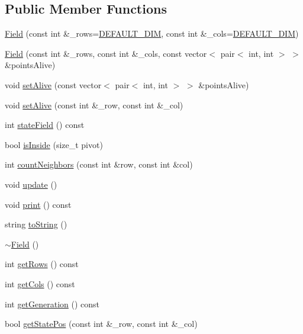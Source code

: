 \subsection*{Public Member Functions}
\begin{DoxyCompactItemize}
\item 
\hyperlink{classField_a9db14b333489e7cb486b1d06631aa3ea}{Field} (const int \&\+\_\+rows=\hyperlink{classField_add3cd7850a250739b0eb08caf41427da}{D\+E\+F\+A\+U\+L\+T\+\_\+\+D\+IM}, const int \&\+\_\+cols=\hyperlink{classField_add3cd7850a250739b0eb08caf41427da}{D\+E\+F\+A\+U\+L\+T\+\_\+\+D\+IM})
\item 
\hyperlink{classField_aa87243f12c97d3a861cbeeee9ad6d8c7}{Field} (const int \&\+\_\+rows, const int \&\+\_\+cols, const vector$<$ pair$<$ int, int $>$ $>$ \&points\+Alive)
\item 
void \hyperlink{classField_abb2ec476cd400e9c2e3fea4c502738de}{set\+Alive} (const vector$<$ pair$<$ int, int $>$ $>$ \&points\+Alive)
\item 
void \hyperlink{classField_ae7feca864aadf6aceba260cc6aee64b0}{set\+Alive} (const int \&\+\_\+row, const int \&\+\_\+col)
\item 
int \hyperlink{classField_ab4bf046987359d627f8583c3d4ae3c62}{state\+Field} () const 
\item 
bool \hyperlink{classField_a404555b889668199df5e5aa52270a3b1}{is\+Inside} (size\+\_\+t pivot)
\item 
int \hyperlink{classField_a8cf89a674edccb691fb3a61375fe7c68}{count\+Neighbors} (const int \&row, const int \&col)
\item 
void \hyperlink{classField_af48801e4d3d1b92ba7c094132fb56cb3}{update} ()
\item 
void \hyperlink{classField_ae1faecba43b9fb78e8662ec589ee00aa}{print} () const 
\item 
string \hyperlink{classField_aefecec2cf434f89b09d584cff80c8951}{to\+String} ()
\item 
\hyperlink{classField_a45d6e6d09b8f8e46de62b40119d62c60}{$\sim$\+Field} ()
\item 
int \hyperlink{classField_ae585f252de1b8fb4b90fd3424faa8e62}{get\+Rows} () const 
\item 
int \hyperlink{classField_a453287eda20027f08bf0f47033e13423}{get\+Cols} () const 
\item 
int \hyperlink{classField_aba0ae2354fad38ef65ba45dd63c0f788}{get\+Generation} () const 
\item 
bool \hyperlink{classField_ae96f8883d511c998bdb984ffee5dafa5}{get\+State\+Pos} (const int \&\+\_\+row, const int \&\+\_\+col)
\end{DoxyCompactItemize}
